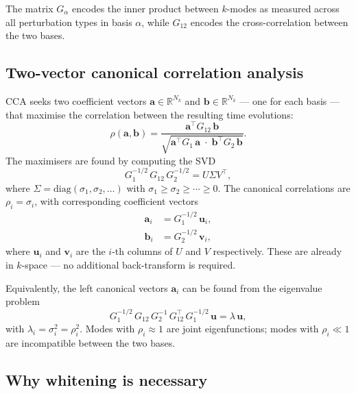 \documentclass[a4paper,11pt]{article}
\newcommand{\va}{\bm{a}}
\newcommand{\vb}{\bm{b}}
\newcommand{\vu}{\bm{u}}
\newcommand{\vv}{\bm{v}}
\newcommand{\Gb}[1]{G_{#1}}
\newcommand{\Nk}{N_k}
\theoremstyle{plain}
\begin{document}
The matrix $\Gb{\alpha}$ encodes the inner product between $k$-modes as measured across all perturbation types in basis $\alpha$, while $\Gb{12}$ encodes the cross-correlation between the two bases.

\subsection{Two-vector canonical correlation analysis}
\label{sec:cca-def}

CCA seeks two coefficient vectors $\va \in \mathbb{R}^{\Nk}$ and $\vb \in \mathbb{R}^{\Nk}$ --- one for each basis --- that maximise the correlation between the resulting time evolutions:
\begin{equation}
    \rho(\va, \vb) = \frac{\va^\top \Gb{12} \, \vb}{\sqrt{\va^\top \Gb{1} \, \va \;\cdot\; \vb^\top \Gb{2} \, \vb}}.
    \label{eq:cca}
\end{equation}
The maximisers are found by computing the SVD
\begin{equation}
    \Gb{1}^{-1/2} \, \Gb{12} \, \Gb{2}^{-1/2} = U \Sigma V^\top,
    \label{eq:svd}
\end{equation}
where $\Sigma = \mathrm{diag}(\sigma_1, \sigma_2, \ldots)$ with $\sigma_1 \geq \sigma_2 \geq \cdots \geq 0$.
The canonical correlations are $\rho_i = \sigma_i$, with corresponding coefficient vectors
\begin{align}
    \va_i &= \Gb{1}^{-1/2} \, \vu_i, \label{eq:a} \\
    \vb_i &= \Gb{2}^{-1/2} \, \vv_i, \label{eq:b}
\end{align}
where $\vu_i$ and $\vv_i$ are the $i$-th columns of $U$ and $V$ respectively.
These are already in $k$-space --- no additional back-transform is required.

Equivalently, the left canonical vectors $\va_i$ can be found from the eigenvalue problem
\begin{equation}
    \Gb{1}^{-1/2} \, \Gb{12} \, \Gb{2}^{-1} \, \Gb{12}^\top \, \Gb{1}^{-1/2} \, \vu = \lambda \, \vu,
    \label{eq:gev}
\end{equation}
with $\lambda_i = \sigma_i^2 = \rho_i^2$.
Modes with $\rho_i \approx 1$ are joint eigenfunctions; modes with $\rho_i \ll 1$ are incompatible between the two bases.

\subsection{Why whitening is necessary}
\label{sec:whitening}
\end{document}
